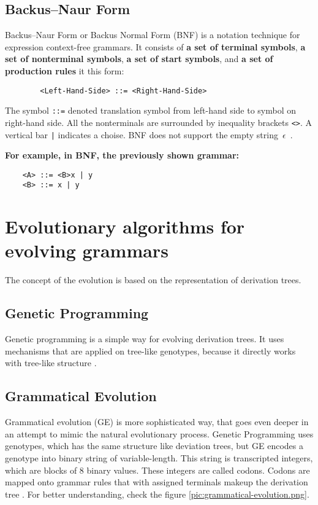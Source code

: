   \subsection{Backus--Naur Form}
  Backus--Naur Form or Backus Normal Form (BNF) is a notation technique for expression context-free grammars.
  It consists of \textbf{a set of terminal symbols}, \textbf{a set of nonterminal symbols}, \textbf{a set of start symbols}, and \textbf{a set of production rules} it this form:
  \begin{verbatim}
        <Left-Hand-Side> ::= <Right-Hand-Side>
  \end{verbatim}

  The symbol \texttt{::=} denoted translation symbol from left-hand side to symbol on right-hand side. All the nonterminals are surrounded by inequality brackets \texttt{<>}. A vertical bar \texttt{|} indicates a choise. BNF does not support the empty string~$\epsilon$~\cite{backus-naur-form}.

  \textbf{For example, in BNF, the previously shown grammar:}
    \begin{verbatim}
    <A> ::= <B>x | y
    <B> ::= x | y
    \end{verbatim}

\section{Evolutionary algorithms for evolving grammars}
The concept of the evolution is based on the representation of derivation trees.
\subsection{Genetic Programming}
Genetic programming is a simple way for evolving derivation trees. It uses mechanisms that are applied on tree-like genotypes, because it directly works with tree-like structure \cite{genetic-programming}.


\subsection{Grammatical Evolution}
Grammatical evolution (GE) is more sophisticated way, that goes even deeper in an attempt to mimic the natural evolutionary process. Genetic Programming uses genotypes, which has the same structure like deviation trees, but GE encodes a genotype into binary string of variable-length. This string is transcripted integers, which are blocks of 8 binary values. These integers are called codons. Codons are mapped onto grammar rules that with assigned terminals makeup the derivation tree \cite{grammatical-evolution}. For better understanding, check the figure \ref{pic:grammatical-evolution.png}.

